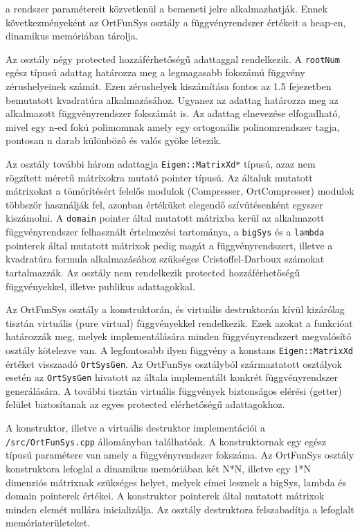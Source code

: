 \documentclass[oneside,titlepage,12pt,a4paper]{report}
\begin{document}
a rendszer paramétereit közvetlenül a bemeneti jelre alkalmazhatják. Ennek következményeként az OrtFunSys osztály a függvényrendszer értékeit a heap-en, dinamikus memóriában tárolja.
\par Az osztály négy protected hozzáférhetőségű adattaggal rendelkezik. A \texttt{rootNum} egész típusú adattag határozza meg a legmagasabb fokszámú függvény zérushelyeinek számát. Ezen zérushelyek kiszámítása fontos az 1.5 fejezetben bemutatott kvadratúra alkalmazásához. Ugyanez az adattag határozza meg az alkalmazott függvényrendszer fokszámát is. Az adattag elnevezése elfogadható, mivel egy n-ed fokú polimomnak amely egy ortogonális polinomrendszer tagja, pontosan n darab különböző és valós gyöke létezik.
\par Az osztály további három adattagja \texttt{Eigen::MatrixXd*} típusú, azaz nem rögzített méretű mátrixokra mutató pointer típusú. Az általuk mutatott mátrixokat a tömörítésért felelős modulok (Compresser, OrtCompresser) modulok többször használják fel, azonban értéküket elegendő szívütésenként egyszer kiszámolni.  A \texttt{domain} pointer által mutatott mátrixba kerül az alkalmazott függvényrendszer felhasznált értelmezési tartománya, a \texttt{bigSys} és a \texttt{lambda} pointerek által mutatott mátrixok pedig magát a függvényrendszert, illetve a kvadratúra formula alkalmazásához szükséges Cristoffel-Darboux számokat tartalmazzák. Az osztály nem rendelkezik protected hozzáférhetőségű függvényekkel, illetve publikus adattagokkal.
\par Az OrtFunSys osztály a konstruktorán, és virtuális destruktorán kívül kizárólag tisztán virtuális (pure virtual) függvényekkel rendelkezik. Ezek azokat a funkcióat határozzák meg, melyek implementálására minden függvényrendszert megvalósító osztály kötelezve van. A legfontosabb ilyen függvény a konstans \texttt{Eigen::MatrixXd} értéket visszaadó \texttt{OrtSysGen}. Az OrtFunSys osztályból származtatott osztályok esetén az \texttt{OrtSysGen} hivatott az általa implementált konkrét függvényrendszer generálására. A további tisztán virtuális függvények biztonságos elérési (getter) felület biztosítanak az egyes protected elérhetőségű adattagokhoz. 
\par A konstruktor, illetve a virtuális destruktor implementációi a \texttt{/src/OrtFunSys.cpp} állományban találhatóak. A konstruktornak egy egész típusú paramétere van amely a függvényrendszer fokszáma. Az OrtFunSys osztály konstruktora lefoglal a dinamikus memóriában két N*N, illetve egy 1*N dimenziós mátrixnak szükséges helyet, melyek címei lesznek a bigSys, lambda és domain pointerek értékei. A konstruktor pointerek által mutatott mátrixok minden elemét nullára inicializálja. Az osztály destruktora felszabadítja a lefoglalt memóriaterületeket. 
\end{document}
